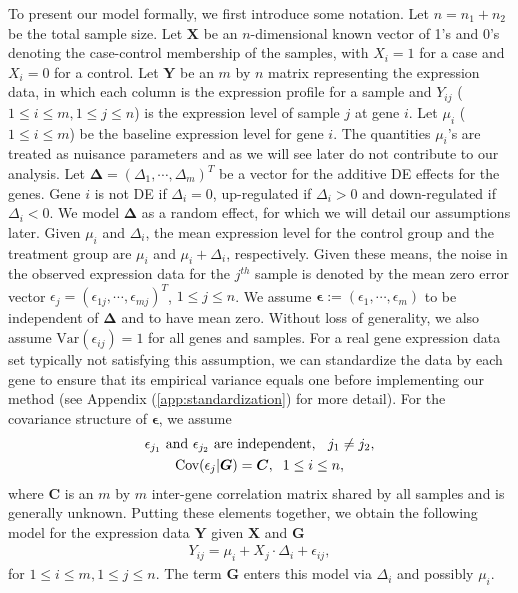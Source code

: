 	To present our model formally, we first introduce some notation. Let $n=n_1+n_2$ be the total
	sample size. Let $\bm X$ be an $n$-dimensional known vector of 1's and 0's denoting the 
	case-control membership of the samples, with $X_i=1$ for a case and $X_i=0$ for a control. Let 
	$\bm Y$ be an $m$ by $n$ matrix representing the expression data, in which each column is the 
	expression profile for a sample and $Y_{ij}$ ($1\le i\le m, 1\le j\le n$) is the expression 
	level of sample $j$ at gene	$i$. Let $\mu_i$ ($1\le i\le m$) be the baseline expression 
	level for gene $i$. The quantities $\mu_i$'s are treated as nuisance parameters and as we will 
	see later do not contribute to our analysis. Let $\bm \Delta=(\Delta_1, \cdots, \Delta_m)^T$ be 
	a vector for the additive DE effects for the genes. Gene $i$ is not DE if $\Delta_i=0$, 
	up-regulated if $\Delta_i >0 $ and down-regulated if $\Delta_i<0$. We model $\bm \Delta$ as a 
	random effect, for which we will detail our assumptions later. Given $\mu_i$ and $\Delta_i$, 
	the mean expression level for the control group and the treatment group are $\mu_i$ and 
	$\mu_i+\Delta_i$, respectively. Given these means, the noise in the observed expression data 
	for the $j^{th}$ sample is denoted by the mean zero error vector 
	$\epsilon_j=(\epsilon_{1j},\cdots,\epsilon_{mj})^T$, $1\le j\le n$. We assume
	$\bm\epsilon:=(\epsilon_1,\cdots,\epsilon_m)$ to be independent of $\bm \Delta$ and to have mean
	zero. Without loss of generality, we also assume $\mbox{Var}(\epsilon_{ij})=1$ for all genes and
	samples. For a real gene expression data set typically not satisfying this assumption, we can
	standardize the data by each gene to ensure that its empirical variance equals one before 
	implementing our method (see Appendix (\ref{app:standardization}) for more detail). For the 
	covariance structure of $\bm \epsilon$, we assume 
	\begin{gather}
	\text{$\epsilon_{j_1}$ and $\epsilon_{j_2}$ are independent, \;\;$j_1\ne
		j_2$},\label{eq:gene_indep}\\
	\mbox{Cov}(\epsilon_j|\bm G)=\bm C, \;\;1\le i\le n,\label{eq:gene_cor}
	\end{gather}
	where $\bm C$ is an $m$ by $m$ inter-gene correlation matrix shared by all samples and is
	generally unknown. Putting these elements together, we obtain the following model for the 
	expression data $\bm Y$ given $\bm X$ and $\bm G$ 
	\begin{align}
	\label{eq:Ymodel}
	Y_{ij} = \mu_i + X_j\cdot\Delta_i + \epsilon_{ij},
	\end{align}
	for $1\le i\le m, 1\le j\le n$. The term $\bm G$ enters this model via $\Delta_i$ and possibly 
	$\mu_i$.
	
